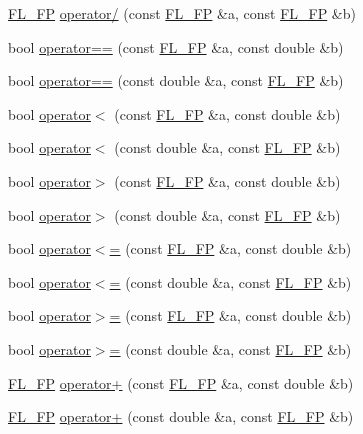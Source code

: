 \begin{DoxyCompactItemize}
\item 
\hyperlink{class_f_l___f_p}{F\+L\+\_\+\+FP} \hyperlink{class_f_l___f_p_a746b7c97a3194b33df5e6e04ce0ce5e8}{operator/} (const \hyperlink{class_f_l___f_p}{F\+L\+\_\+\+FP} \&a, const \hyperlink{class_f_l___f_p}{F\+L\+\_\+\+FP} \&b)
\item 
bool \hyperlink{class_f_l___f_p_a666442f1b900ba2e6680d77ec4261a9e}{operator==} (const \hyperlink{class_f_l___f_p}{F\+L\+\_\+\+FP} \&a, const double \&b)
\item 
bool \hyperlink{class_f_l___f_p_a8b8fd18407f83f9bbf63012179eb694d}{operator==} (const double \&a, const \hyperlink{class_f_l___f_p}{F\+L\+\_\+\+FP} \&b)
\item 
bool \hyperlink{class_f_l___f_p_ae0d89fcb254db9759b80cca31de5ee00}{operator$<$} (const \hyperlink{class_f_l___f_p}{F\+L\+\_\+\+FP} \&a, const double \&b)
\item 
bool \hyperlink{class_f_l___f_p_af1a4354ad8a5d501c5d9f3a784ca3b95}{operator$<$} (const double \&a, const \hyperlink{class_f_l___f_p}{F\+L\+\_\+\+FP} \&b)
\item 
bool \hyperlink{class_f_l___f_p_acc2241533b3b7f53f6e8bc40c77233a5}{operator$>$} (const \hyperlink{class_f_l___f_p}{F\+L\+\_\+\+FP} \&a, const double \&b)
\item 
bool \hyperlink{class_f_l___f_p_aed84a1784274a020d95f2c01746f2b5c}{operator$>$} (const double \&a, const \hyperlink{class_f_l___f_p}{F\+L\+\_\+\+FP} \&b)
\item 
bool \hyperlink{class_f_l___f_p_a2453dc97f7fd85f4a1c07f5d888c4b87}{operator$<$=} (const \hyperlink{class_f_l___f_p}{F\+L\+\_\+\+FP} \&a, const double \&b)
\item 
bool \hyperlink{class_f_l___f_p_a78d1e2f69d82635ea82a2b717d79d5bb}{operator$<$=} (const double \&a, const \hyperlink{class_f_l___f_p}{F\+L\+\_\+\+FP} \&b)
\item 
bool \hyperlink{class_f_l___f_p_ace9ff2ae86cfecb59b601ef983b5189d}{operator$>$=} (const \hyperlink{class_f_l___f_p}{F\+L\+\_\+\+FP} \&a, const double \&b)
\item 
bool \hyperlink{class_f_l___f_p_a1f7bf9f00e36c130033949619f5261dd}{operator$>$=} (const double \&a, const \hyperlink{class_f_l___f_p}{F\+L\+\_\+\+FP} \&b)
\item 
\hyperlink{class_f_l___f_p}{F\+L\+\_\+\+FP} \hyperlink{class_f_l___f_p_a230919bb5d28822bd782aa7ca3465eba}{operator+} (const \hyperlink{class_f_l___f_p}{F\+L\+\_\+\+FP} \&a, const double \&b)
\item 
\hyperlink{class_f_l___f_p}{F\+L\+\_\+\+FP} \hyperlink{class_f_l___f_p_a4934b87fe91ceefeb77cc0fbf926329c}{operator+} (const double \&a, const \hyperlink{class_f_l___f_p}{F\+L\+\_\+\+FP} \&b)

\end{DoxyCompactItemize}
